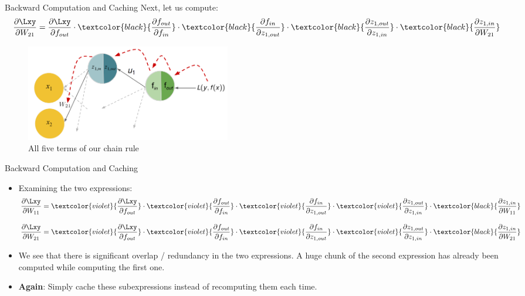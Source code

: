 \begin{frame} {Backward Computation and Caching}
Next, let us compute:
      $$\frac{\partial \Lxy}{\partial W_{21}} = 
\frac{\partial \Lxy}{\partial f_{out}} \cdot  \textcolor{black}{\frac{\partial f_{out}}{\partial f_{in}}} \cdot  \textcolor{black}{\frac{\partial f_{in}}{\partial z_{1,out}}} \cdot  \textcolor{black}{\frac{\partial z_{1,out}}{\partial z_{1,in}}} \cdot  \textcolor{black}{\frac{\partial z_{1,in}}{\partial W_{21}}}$$
        \begin{figure}
    \centering
      \includegraphics[width=9cm]{../plots/backprop_gg_new.png}
      \caption{All five terms of our chain rule}
  \end{figure}
\end{frame}

\begin{frame} {Backward Computation and Caching}
\begin{itemize}
\item Examining the two expressions:
$$\frac{\partial \Lxy}{\partial W_{11}} = 
\textcolor{violet}{\frac{\partial \Lxy}{\partial f_{out}}} \cdot  \textcolor{violet}{\frac{\partial f_{out}}{\partial f_{in}}} \cdot  \textcolor{violet}{\frac{\partial f_{in}}{\partial z_{1,out}}} \cdot  \textcolor{violet}{\frac{\partial z_{1,out}}{\partial z_{1,in}}} \cdot  \textcolor{black}{\frac{\partial z_{1,in}}{\partial W_{11}}}$$

$$\frac{\partial \Lxy}{\partial W_{21}} =     
\textcolor{violet}{\frac{\partial \Lxy}{\partial f_{out}}} \cdot  \textcolor{violet}{\frac{\partial f_{out}}{\partial f_{in}}} \cdot  \textcolor{violet}{\frac{\partial f_{in}}{\partial z_{1,out}}} \cdot  \textcolor{violet}{\frac{\partial z_{1,out}}{\partial z_{1,in}}} \cdot  \textcolor{black}{\frac{\partial z_{1,in}}{\partial W_{21}}}$$

\item We see that there is significant overlap / redundancy in the two expressions. A huge chunk of the second expression has already been computed while computing the first one.
\item \textbf{Again}: Simply cache these subexpressions instead of recomputing them each time.
\end{itemize}
\end{frame}

